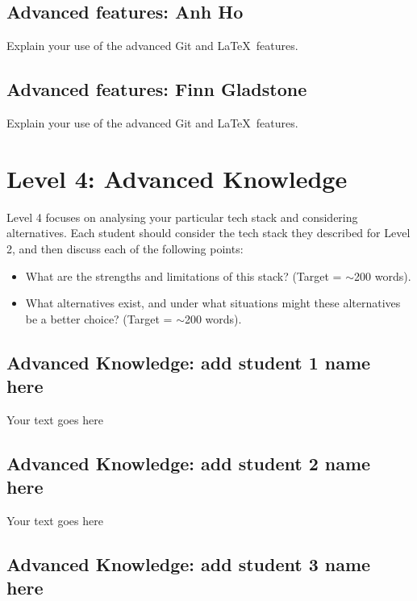 \documentclass[a4paper, 11pt]{report}
\begin{document}
	
	\subsection{Advanced features: Anh Ho}
	
	Explain your use of the advanced Git and \LaTeX\ features. 
	
	\subsection{Advanced features: Finn Gladstone}
	
	Explain your use of the advanced Git and \LaTeX\ features. 
	
 
	
	
	
	
	\newpage
	\section{Level 4: Advanced Knowledge}
	
	Level 4 focuses on analysing your particular tech stack and considering alternatives. Each student should consider the tech stack they described for Level 2, and then discuss each of the following points:
	\begin{itemize}
		\item What are the strengths and limitations of this stack? (Target = $\sim$200 words).
		\item What alternatives exist, and under what situations might these alternatives be a better choice? (Target = $\sim$200 words).
	\end{itemize}
	
	\subsection{Advanced Knowledge: add student 1 name here}
	
	Your text goes here
	
	\subsection{Advanced Knowledge: add student 2 name here}
	
	Your text goes here
	
	\subsection{Advanced Knowledge: add student 3 name here}
	
\end{document}
